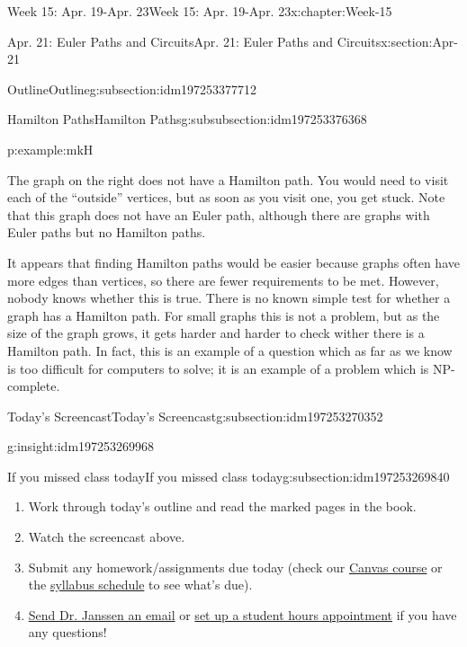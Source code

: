 \documentclass[oneside,10pt,]{book}
\numberwithin{equation}{section}
\begin{document}
\begin{chapterptx}{Week 15: Apr. 19-Apr. 23}{}{Week 15: Apr. 19-Apr. 23}{}{}{x:chapter:Week-15}
\begin{sectionptx}{Apr. 21: Euler Paths and Circuits}{}{Apr. 21: Euler Paths and Circuits}{}{}{x:section:Apr-21}
\begin{subsectionptx}{Outline}{}{Outline}{}{}{g:subsection:idm197253377712}
\begin{subsubsectionptx}{Hamilton Paths}{}{Hamilton Paths}{}{}{g:subsubsection:idm197253376368}
\begin{example}{}{p:example:mkH}
\begin{sidebyside}{1}{0.4}{0.4}{0}
\begin{sbspanel}{0.2}
{}%
\end{sbspanel}%
\end{sidebyside}%
\par
The graph on the right does not have a Hamilton path. You would need to visit each of the ``outside'' vertices, but as soon as you visit one, you get stuck. Note that this graph does not have an Euler path, although there are graphs with Euler paths but no Hamilton paths.%
\end{example}
 It appears that finding Hamilton paths would be easier because graphs often have more edges than vertices, so there are fewer requirements to be met. However, nobody knows whether this is true. There is no known simple test for whether a graph has a Hamilton path. For small graphs this is not a problem, but as the size of the graph grows, it gets harder and harder to check wither there is a Hamilton path. In fact, this is an example of a question which as far as we know is too difficult for computers to solve; it is an example of a problem which is NP-complete.%
\end{subsubsectionptx}
\end{subsectionptx}
%
%
\typeout{************************************************}
\typeout{************************************************}
%
\begin{subsectionptx}{Today's Screencast}{}{Today's Screencast}{}{}{g:subsection:idm197253270352}
\begin{insight}{}{g:insight:idm197253269968}%
\end{insight}
\end{subsectionptx}
%
%
\typeout{************************************************}
\typeout{************************************************}
%
\begin{subsectionptx}{If you missed class today}{}{If you missed class today}{}{}{g:subsection:idm197253269840}
%
\begin{enumerate}
\item{}Work through today's outline and read the marked pages in the book.%
\item{}Watch the screencast above.%
\item{}Submit any homework\slash{}assignments due today (check our \href{https://dordt.instructure.com/courses/3110050}{Canvas course} or the \href{https://prof.mkjanssen.org/ds/index.html\#schedule}{syllabus schedule} to see what's due).%
\item{}\href{mailto:mike.janssen@dordt.edu}{Send Dr. Janssen an email} or \href{https://calendly.com/mkjanssen/student-hours}{set up a student hours appointment} if you have any questions!%

\end{enumerate}
\end{subsectionptx}
\end{sectionptx}
\end{chapterptx}
\end{document}
